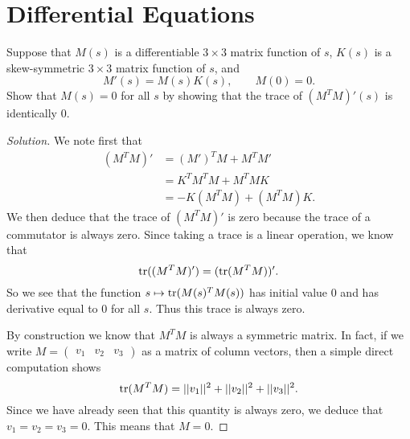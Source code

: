 \documentclass[Shifrin_Solutions_Spring_2018]{subfiles}
\begin{document}
\section{Differential Equations}

\begin{exercise}Suppose that $M(s)$ is a differentiable $3\times 3$ matrix function of $s$, $K(s)$ is a skew-symmetric $3\times 3$ matrix function of $s$, and
\[
M'(s) = M(s)K(s), \qquad M(0)=0 .
\]
Show that $M(s) = 0$ for all $s$ by showing that the trace of $(M^TM)'(s)$ is identically $0$.
\end{exercise}

\begin{proof}[Solution]
We note first that
\[
\begin{split}
(M^TM)' & = (M')^T M + M^T M' \\
	& = K^T M^T M + M^T M K \\
	& = - K (M^TM) + (M^TM)K .
\end{split}
\]
We then deduce that the trace of $(M^TM)'$ is zero because the trace of a commutator is always zero. Since taking a trace is a linear operation, we know that
\[
\operatorname{\mathrm{tr}}((M^T M)') = (\operatorname{\mathrm{tr}}(M^T M))' .
\]
So we see that the function $s \mapsto \operatorname{\mathrm{tr}}(M(s)^TM(s))$ has initial value $0$ and has derivative equal to $0$ for all $s$. Thus this trace is always zero.

By construction we know that $M^TM$ is always a symmetric matrix. In fact, if we write $M = \begin{pmatrix} v_1 & v_2 & v_3 \end{pmatrix}$ as a matrix of column vectors, then a simple direct computation shows
\[
\operatorname{\mathrm{tr}}(M^T M) = ||v_1||^2 + ||v_2||^2 + ||v_3||^2 .
\]
Since we have already seen that this quantity is always zero, we deduce that $v_1 = v_2  = v_3 = 0$. This means that $M = 0$.
\end{proof}

\vspace{1cm}

\end{document}
